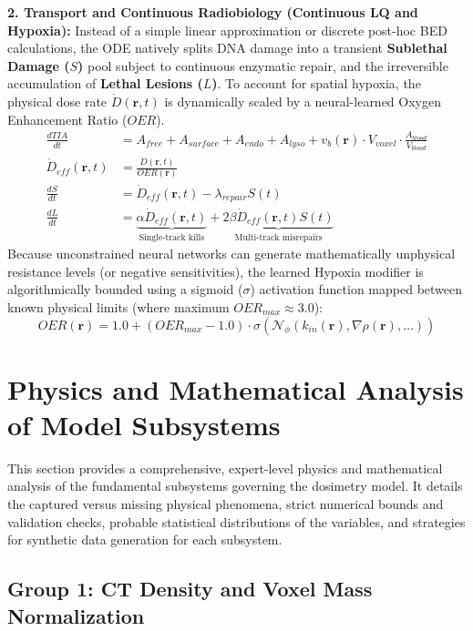 \documentclass[11pt,a4paper]{article}
\begin{document}
\textbf{2. Transport and Continuous Radiobiology (Continuous LQ and Hypoxia):}
Instead of a simple linear approximation or discrete post-hoc BED calculations, the ODE natively splits DNA damage into a transient \textbf{Sublethal Damage ($S$)} pool subject to continuous enzymatic repair, and the irreversible accumulation of \textbf{Lethal Lesions ($L$)}. To account for spatial hypoxia, the physical dose rate $\dot{D}(\mathbf{r}, t)$ is dynamically scaled by a neural-learned Oxygen Enhancement Ratio ($OER$).
\begin{align}
    \frac{dTIA}{dt} &= A_{free} + A_{surface} + A_{endo} + A_{lyso} + v_b(\mathbf{r}) \cdot V_{voxel} \cdot \frac{A_{blood}}{V_{blood}} \\
    \dot{D}_{eff}(\mathbf{r}, t) &= \frac{\dot{D}(\mathbf{r}, t)}{OER(\mathbf{r})} \\
    \frac{dS}{dt} &= \dot{D}_{eff}(\mathbf{r}, t) - \lambda_{repair} S(t) \\
    \frac{dL}{dt} &= \underbrace{\alpha \dot{D}_{eff}(\mathbf{r}, t)}_{\text{Single-track kills}} + \underbrace{2\beta \dot{D}_{eff}(\mathbf{r}, t) S(t)}_{\text{Multi-track misrepairs}}
\end{align}
Because unconstrained neural networks can generate mathematically unphysical resistance levels (or negative sensitivities), the learned Hypoxia modifier is algorithmically bounded using a sigmoid ($\sigma$) activation function mapped between known physical limits (where maximum $OER_{max} \approx 3.0$):
\begin{equation}
    OER(\mathbf{r}) = 1.0 + (OER_{max} - 1.0) \cdot \sigma\left(\mathcal{N}_\phi(k_{in}(\mathbf{r}), \nabla\rho(\mathbf{r}), \dots)\right)
\end{equation}


\section{Physics and Mathematical Analysis of Model Subsystems}

This section provides a comprehensive, expert-level physics and mathematical analysis of the fundamental subsystems governing the dosimetry model. It details the captured versus missing physical phenomena, strict numerical bounds and validation checks, probable statistical distributions of the variables, and strategies for synthetic data generation for each subsystem.

\subsection{Group 1: CT Density and Voxel Mass Normalization}
\end{document}
